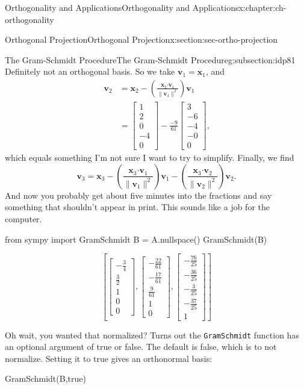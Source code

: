 \documentclass[oneside,10pt,]{book}
\newcommand{\mono}[1]{\texttt{#1}}
\numberwithin{equation}{section}
\newcommand{\bbm}{\begin{bmatrix}}
\newcommand{\ebm}{\end{bmatrix}}
\newcommand{\dotp}{\!\boldsymbol{\cdot}\!}
\newcommand{\len}[1]{\lVert #1\rVert}
\newcommand{\vv}{\mathbf{v}}
\newcommand{\xx}{\mathbf{x}}
\newcommand{\amp}{&}
\begin{document}
\begin{chapterptx}{Orthogonality and Applications}{}{Orthogonality and Applications}{}{}{x:chapter:ch-orthogonality}
\begin{sectionptx}{Orthogonal Projection}{}{Orthogonal Projection}{}{}{x:section:sec-ortho-projection}
\begin{subsectionptx}{The Gram-Schmidt Procedure}{}{The Gram-Schmidt Procedure}{}{}{g:subsection:idp81}
\begin{equation*}
\end{equation*}
Definitely not an orthogonal basis. So we take \(\vv_1=\xx_1\), and%
\begin{align*}
\vv_2 \amp = \xx_2-\left(\frac{\xx_2\dotp\vv_1}{\len{\vv_1}^2}\right)\vv_1\\
\amp = \bbm 1\\2\\0\\-4\\0\ebm -\frac{-9}{61}\bbm 3\\-6\\-4\\-0\\0\ebm \text{,}
\end{align*}
which equals something I'm not sure I want to try to simplify. Finally, we find%
\begin{equation*}
\vv_3 = \xx_3-\left(\frac{\xx_3\dotp \vv_1}{\len{\vv_1}^2}\right)\vv_1-\left(\frac{\xx_3\dotp\vv_2}{\len{\vv_2}^2}\right)\vv_2\text{.}
\end{equation*}
And now you probably get about five minutes into the fractions and say something that shouldn't appear in print. This sounds like a job for the computer.%
\begin{sageinput}
from sympy import GramSchmidt
B = A.nullspace()
GramSchmidt(B)
\end{sageinput}
\begin{sageoutput}
\[\left[\bbm -\frac34\\ \frac32\\1\\0\\0\ebm, \bbm -\frac{22}{61}\\-\frac{17}{61}\\ \frac{9}{61}\\1\\0\ebm, \bbm -\frac{76}{25}\\-\frac{36}{25}\\-\frac{3}{25}\\-\frac{37}{25}\\1\ebm\right]\]
\end{sageoutput}
Oh wait, you wanted that normalized? Turns out the \mono{GramSchmidt} function has an optional argument of true or false. The default is false, which is to not normalize. Setting it to true gives an orthonormal basis:%
\begin{sageinput}
GramSchmidt(B,true)
\end{sageinput}
\begin{sageoutput}

\end{sageoutput}
\end{subsectionptx}
\end{sectionptx}
\end{chapterptx}
\end{document}
